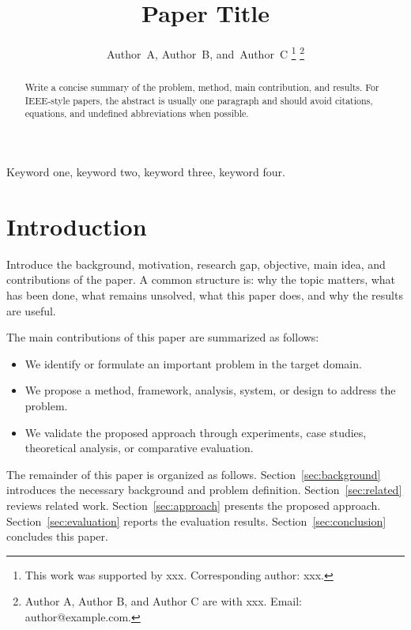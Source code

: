 \documentclass[letterpaper,10pt,journal,twoside]{IEEEtran}
\begin{document}
\title{Paper Title}

\author{Author~A,
        Author~B,
        and~Author~C%
\thanks{This work was supported by xxx. Corresponding author: xxx.}
\thanks{Author A, Author B, and Author C are with xxx.
Email: author@example.com.}
}

\maketitle

\begin{abstract}
Write a concise summary of the problem, method, main contribution, and results.
For IEEE-style papers, the abstract is usually one paragraph and should avoid
citations, equations, and undefined abbreviations when possible.
\end{abstract}

\begin{IEEEkeywords}
Keyword one, keyword two, keyword three, keyword four.
\end{IEEEkeywords}

\section{Introduction}
\label{sec:introduction}

Introduce the background, motivation, research gap, objective, main idea, and
contributions of the paper. A common structure is: why the topic matters, what
has been done, what remains unsolved, what this paper does, and why the results
are useful.

The main contributions of this paper are summarized as follows:
\begin{itemize}
    \item We identify or formulate an important problem in the target domain.
    \item We propose a method, framework, analysis, system, or design to address
    the problem.
    \item We validate the proposed approach through experiments, case studies,
    theoretical analysis, or comparative evaluation.
\end{itemize}

The remainder of this paper is organized as follows.
Section~\ref{sec:background} introduces the necessary background and problem
definition. Section~\ref{sec:related} reviews related work.
Section~\ref{sec:approach} presents the proposed approach.
Section~\ref{sec:evaluation} reports the evaluation results.
Section~\ref{sec:conclusion} concludes this paper.
\end{document}
